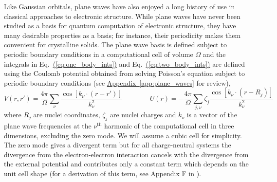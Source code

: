 \documentclass[superscriptaddress,aps,pra,nofootinbib,notitlepage,10pt,longbibliography]{revtex4-1}
\newcommand{\eq}[1]{Eq.~\hyperref[eq:#1]{(\ref*{eq:#1})}}
\DeclareRobustCommand{\app}[1]{\hyperref[app:#1]{Appendix~\ref*{app:#1}}}
\begin{document}
Like Gaussian orbitals, plane waves have also enjoyed a long history of use in classical approaches to electronic structure. While plane waves have never been studied as a basis for quantum computation of electronic structure, they have many desirable properties as a basis; for instance, their periodicity makes them convenient for crystalline solids. The plane wave basis is defined subject to periodic boundary conditions in a computational cell of volume $\Omega$ and the integrals in \eq{one_body_ints} and \eq{two_body_ints} are defined using the Coulomb potential obtained from solving Poisson's equation subject to periodic boundary conditions (see \app{plane_waves} for review),
\begin{equation}
\label{eq:periodic_coulomb_r}
V\left(r, r'\right) = \frac{4 \pi}{\Omega} \sum_{\nu} \frac{\cos \left[k_\nu \cdot \left(r - r'\right)\right]}{k_\nu^2}
\quad \quad \quad \quad
%
U\left(r\right) = - \frac{4 \pi}{\Omega} \sum_{j,\nu} \zeta_j \frac{\cos \left[k_\nu \cdot \left(r - R_j\right)\right]}{k_\nu^2}
\end{equation}
where $R_j$ are nuclei coordinates, $\zeta_j$ are nuclei charges and $k_\nu$ is a vector of the plane wave frequencies at the $\nu^{\textrm{th}}$ harmonic of the computational cell in three dimensions, excluding the zero mode. We will assume a cubic cell for simplicity. The zero mode gives a divergent term  but for all charge-neutral systems the divergence from the electron-electron interaction cancels with the divergence from the external potential and contributes only a constant term which depends on the unit cell shape (for a derivation of this term, see Appendix F in \cite{Martin2004}).
\end{document}
